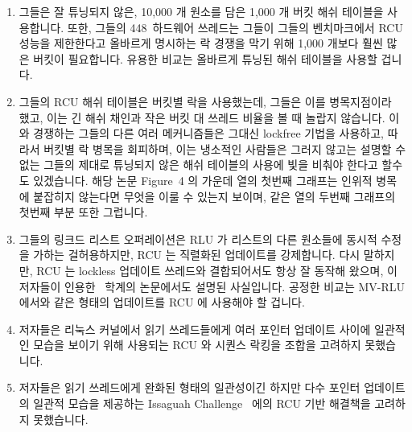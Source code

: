 {\begin{enumerate}
	\fi

	\item	그들은 잘 튜닝되지 않은, 10,000 개 원소를 담은 1,000 개 버킷
		해쉬 테이블을 사용합니다.
		또한, 그들의 448~하드웨어 쓰레드는 그들이 그들의 벤치마크에서
		RCU 성능을 제한한다고 올바르게 명시하는 락 경쟁을 막기 위해
		1,000 개보다 훨씬 많은 버킷이 필요합니다.
		유용한 비교는 올바르게 튜닝된 해쉬 테이블을 사용할 겁니다.
	\item	그들의 RCU 해쉬 테이블은 버킷별 락을 사용했는데, 그들은 이를
		병목지점이라 했고, 이는 긴 해쉬 채인과 작은 버킷 대 쓰레드
		비율을 볼 때 놀랍지 않습니다.
		이와 경쟁하는 그들의 다른 여러 메커니즘들은 그대신 lockfree
		기법을 사용하고, 따라서 버킷별 락 병목을 회피하며, 이는
		냉소적인 사람들은 그러지 않고는 설명할 수 없는 그들의 제대로
		튜닝되지 않은 해쉬 테이블의 사용에 빛을 비춰야 한다고 할수도
		있겠습니다.
		해당 논문 Figure~4 의 가운데 열의 첫번째 그래프는 인위적 병목에
		붙잡히지 않는다면 무엇을 이룰 수 있는지 보이며, 같은 열의
		두번째 그래프의 첫번째 부분 또한 그럽니다.

	\item	그들의 링크드 리스트 오퍼레이션은 RLU 가 리스트의 다른 원소들에
		동시적 수정을 가하는 걸허용하지만, RCU 는 직렬화된 업데이트를
		강제합니다.
		다시 말하지만, RCU 는 lockless 업데이트 쓰레드와 결합되어서도
		항상 잘 동작해 왔으며, 이 저자들이
		인용한~\cite{MathieuDesnoyers2012URCU} 학계의 논문에서도 설명된
		사실입니다.
		공정한 비교는 MV-RLU 에서와 같은 형태의 업데이트를 RCU 에
		사용해야 할 겁니다.
	\item	저자들은 리눅스 커널에서 읽기 쓰레드들에게 여러 포인터 업데이트
		사이에 일관적인 모습을 보이기 위해 사용되는 RCU 와 시퀀스
		락킹을 조합을 고려하지 못했습니다.
	\item	저자들은 읽기 쓰레드에게 완화된 형태의 일관성이긴 하지만 다수
		포인터 업데이트의 일관적 모습을 제공하는 Issaguah
		Challenge~\cite{PaulEMcKenney2016IssaquahCPPCON} 에의 RCU 기반
		해결책을 고려하지 못했습니다.


\end{enumerate}}
